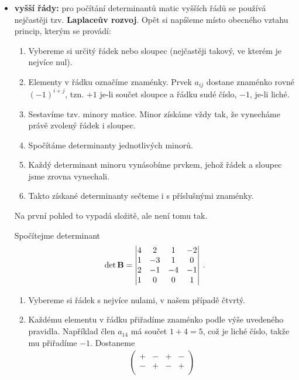 \begin{itemize}
    \item \textbf{vyšší řády:} pro počítání determinantů matic vyšších řádů se používá nejčastěji tzv. \textbf{Laplaceův rozvoj}. Opět si napíšeme místo obecného vztahu princip, kterým se provádí:
    \begin{enumerate}
        \item Vybereme si určitý řádek nebo sloupec (nejčastěji takový, ve kterém je nejvíce nul).
        \item Elementy v řádku označíme znaménky. Prvek $a_{ij}$ dostane znaménko rovné $(-1)^{i+j}$, tzn. $+1$ je-li součet sloupce a řádku sudé číslo, $-1$, je-li liché.
        \item Sestavíme tzv. minory matice. Minor získáme vždy tak, že vynecháme právě zvolený řádek i sloupec.
        \item Spočítáme determinanty jednotlivých minorů.
        \item Každý determinant minoru vynásobíme prvkem, jehož řádek a sloupec jsme zrovna vynechali.
        \item Takto získané determinanty sečteme i s příslušnými znaménky.
    \end{enumerate}
    Na první pohled to vypadá složitě, ale není tomu tak.
    \begin{example}
        Spočítejme determinant
        \begin{align}
            \det \mathbf{B} = \left|\begin{matrix}
                4 & 2 & 1 & -2 \\
                1 & -3 & 1 & 0 \\
                2 & -1 & -4 & -1 \\
                1 & 0 & 0 & 1
                \end{matrix}\right| \:.
        \end{align}
        \begin{enumerate}
            \item Vybereme si řádek s nejvíce nulami, v našem případě čtvrtý.
            \item Každému elementu v řádku přiřadíme znaménko podle výše uvedeného pravidla. Například člen $a_{14}$ má součet $1+4=5$, což je liché číslo, takže mu přiřadíme $-1$. Dostaneme
            \begin{align}
                \begin{pmatrix}
                    + & - & + & - \\
                    - & + & - & + \\

\end{pmatrix}
\end{align}
\end{enumerate}
\end{example}
\end{itemize}
